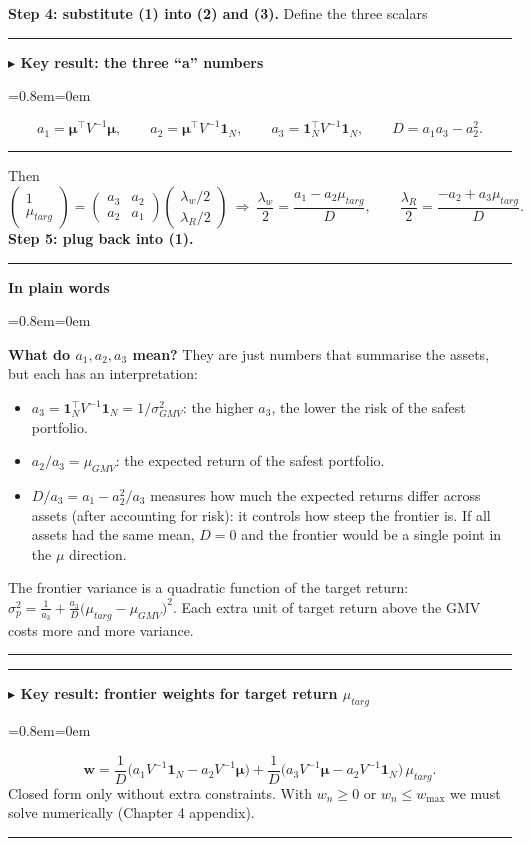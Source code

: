 \documentclass[11pt,a4paper]{report}
\newenvironment{notebox}[1]
  {\par\medskip\Needspace{6\baselineskip}\noindent\rule{\linewidth}{0.4pt}\par\nopagebreak
   \noindent\textbf{#1}\par\nopagebreak
   \begin{list}{}{\leftmargin=0.8em\rightmargin=0em\topsep=2pt}\item[]}
  {\end{list}\nopagebreak\noindent\rule{\linewidth}{0.4pt}\par\medskip}
\newenvironment{keybox}[1][]{\begin{notebox}{$\blacktriangleright$ Key result#1}}{\end{notebox}}
\newenvironment{plainbox}{\begin{notebox}{In plain words}}{\end{notebox}}
\newcommand{\one}{\mathbf{1}_N}
\newcommand{\w}{\bm{w}}
\newcommand{\T}{^{\top}}
\newcommand{\mub}{\bm{\mu}}
\begin{document}
\textbf{Step 4: substitute (1) into (2) and (3).} Define the three scalars
\begin{keybox}[: the three ``a'' numbers]
\[
a_1=\mub\T V^{-1}\mub,\qquad a_2=\mub\T V^{-1}\one,\qquad a_3=\one\T V^{-1}\one,\qquad D=a_1a_3-a_2^2 .
\]
\end{keybox}
Then
\[
\begin{pmatrix}1\\ \mu_{targ}\end{pmatrix}=
\begin{pmatrix}a_3&a_2\\a_2&a_1\end{pmatrix}
\begin{pmatrix}\lambda_w/2\\ \lambda_R/2\end{pmatrix}
\ \Rightarrow\
\frac{\lambda_w}{2}=\frac{a_1-a_2\mu_{targ}}{D},\qquad
\frac{\lambda_R}{2}=\frac{-a_2+a_3\mu_{targ}}{D}.
\]
\textbf{Step 5: plug back into (1).}
\begin{plainbox}
\textbf{What do $a_1,a_2,a_3$ mean?} They are just numbers that summarise the
assets, but each has an interpretation:
\begin{itemize}
  \item $a_3=\one\T V^{-1}\one=1/\sigma^2_{GMV}$: the higher $a_3$, the lower the
    risk of the safest portfolio.
  \item $a_2/a_3=\mu_{GMV}$: the expected return of the safest portfolio.
  \item $D/a_3=a_1-a_2^2/a_3$ measures how much the expected returns differ across
    assets (after accounting for risk): it controls how steep the frontier is.
    If all assets had the same mean, $D=0$ and the frontier would be a single point
    in the $\mu$ direction.
\end{itemize}
The frontier variance is a quadratic function of the target return:
$\sigma_p^2=\frac{1}{a_3}+\frac{a_3}{D}\big(\mu_{targ}-\mu_{GMV}\big)^2$. Each extra
unit of target return above the GMV costs more and more variance.
\end{plainbox}

\begin{keybox}[: frontier weights for target return $\mu_{targ}$]
\[
\w=\frac1D\big(a_1V^{-1}\one-a_2V^{-1}\mub\big)+\frac1D\big(a_3V^{-1}\mub-a_2V^{-1}\one\big)\,\mu_{targ}.
\]
Closed form only without extra constraints. With $w_n\ge0$ or $w_n\le w_{\max}$
we must solve numerically (Chapter 4 appendix).
\end{keybox}
\end{document}
